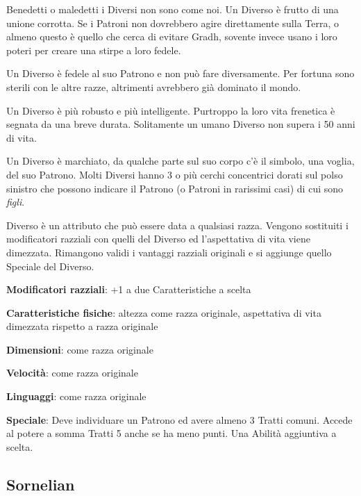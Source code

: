 \begin{multicols}{2}
Benedetti o maledetti i Diversi non sono come noi. Un Diverso è frutto di una unione corrotta. Se i Patroni non dovrebbero agire direttamente sulla Terra, o almeno questo è quello che cerca di evitare Gradh, sovente invece usano i loro poteri per creare una stirpe a loro fedele.

Un Diverso è fedele al suo Patrono e non può fare diversamente. Per fortuna sono sterili con le altre razze, altrimenti avrebbero già dominato il mondo.

Un Diverso è più robusto e più intelligente. Purtroppo la loro vita frenetica è segnata da una breve durata. Solitamente un umano Diverso non supera i 50 anni di vita.

Un Diverso è marchiato, da qualche parte sul suo corpo c'è il simbolo, una voglia, del suo Patrono. Molti Diversi hanno 3 o più cerchi concentrici dorati sul polso sinistro che possono indicare il Patrono (o Patroni in rarissimi casi) di cui sono \emph{figli}.

Diverso è un attributo che può essere data a qualsiasi razza. Vengono sostituiti i modificatori razziali con quelli del Diverso ed l'aspettativa di vita viene dimezzata. Rimangono validi i vantaggi razziali originali e si aggiunge quello Speciale del Diverso.

\textbf{Modificatori razziali}: +1 a due Caratteristiche a scelta

\textbf{Caratteristiche fisiche}: altezza come razza originale, aspettativa di vita dimezzata rispetto a razza originale

\textbf{Dimensioni}: come razza originale

\textbf{Velocità}: come razza originale

\textbf{Linguaggi}: come razza originale

\textbf{Speciale}: Deve individuare un Patrono ed avere almeno 3 Tratti comuni. Accede al potere a somma Tratti 5 anche se ha meno punti. Una Abilità aggiuntiva a scelta.


\subsection{Sornelian}\label{sornelian}\hypertarget{sornelian}{}



\end{multicols}

